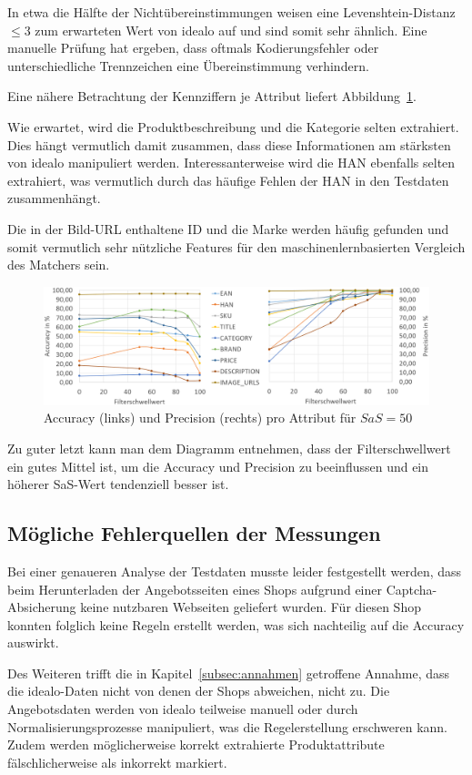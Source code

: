 In etwa die Hälfte der Nichtübereinstimmungen weisen eine Levenshtein-Distanz $\leq 3$ zum erwarteten Wert von idealo
auf und sind somit sehr ähnlich.
Eine manuelle Prüfung hat ergeben, dass oftmals Kodierungsfehler oder unterschiedliche Trennzeichen eine
Übereinstimmung verhindern.

Eine nähere Betrachtung der Kennziffern je Attribut liefert Abbildung~\ref{abb:testdaten}.

Wie erwartet, wird die Produktbeschreibung und die Kategorie selten extrahiert.
Dies hängt vermutlich damit zusammen, dass diese Informationen am stärksten von idealo manipuliert werden.
Interessanterweise wird die HAN ebenfalls selten extrahiert, was vermutlich durch das häufige Fehlen der HAN in den
Testdaten zusammenhängt.

Die in der Bild-URL enthaltene ID und die Marke werden häufig gefunden und somit vermutlich sehr nützliche Features
für den maschinenlernbasierten Vergleich des Matchers sein.

\begin{figure}[H]
    \centering
    \includegraphics[width=\textwidth]{resources/accuracy-and-precision-per-attribute.PNG}
    \caption{Accuracy (links) und Precision (rechts) pro Attribut für $SaS=50$}
    \label{abb:testdaten}
\end{figure}

Zu guter letzt kann man dem Diagramm entnehmen, dass der Filterschwellwert ein gutes Mittel ist, um die Accuracy und
Precision zu beeinflussen und ein höherer SaS-Wert tendenziell besser ist.

\subsection{Mögliche Fehlerquellen der Messungen}
\label{subsec:fehlerquellen}

Bei einer genaueren Analyse der Testdaten musste leider festgestellt werden, dass beim Herunterladen der
Angebotsseiten eines Shops aufgrund einer Captcha-Absicherung keine nutzbaren Webseiten geliefert wurden.
Für diesen Shop konnten folglich keine Regeln erstellt werden, was sich nachteilig auf die Accuracy auswirkt.

Des Weiteren trifft die in Kapitel~\ref{subsec:annahmen} getroffene Annahme, dass die idealo-Daten nicht von denen der
Shops abweichen, nicht zu.
Die Angebotsdaten werden von idealo teilweise manuell oder durch Normalisierungsprozesse manipuliert, was die
Regelerstellung erschweren kann.
Zudem werden möglicherweise korrekt extrahierte Produktattribute fälschlicherweise als inkorrekt markiert.
